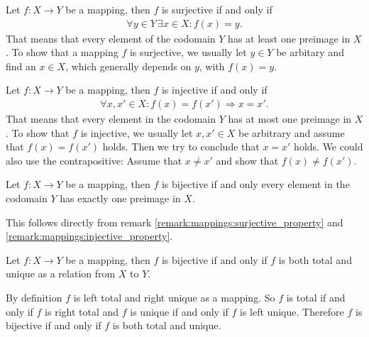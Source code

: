\begin{remarks}
    \begin{remarkenumerate}
        \item\label{remark:mappings:surjective_property} Let $f\colon X\rightarrow Y$ be a mapping, then $f$ is surjective if and only if
        \begin{align}\forall y\in Y\, \exists x\in X\colon f(x)=y.\end{align}
        That means that every element of the codomain $Y$ has at least one preimage in $X$. To show that a mapping $f$ is surjective, we usually let $y\in Y$ be arbitary and find an $x\in X$, which generally depends on $y$, with $f(x)=y$.
        \item\label{remark:mappings:injective_property}  Let $f\colon X\rightarrow Y$ be a mapping, then $f$ is injective if and only if
        \begin{align}\forall x,x'\in X\colon f(x)=f(x')\Rightarrow x=x'.\end{align}
        That means that every element in the codomain $Y$ has at most one preimage in $X$. To show that $f$ is injective, we usually let $x,x'\in X$ be arbitrary and assume that $f(x)=f(x')$ holds. Then we try to conclude that $x=x'$ holds. We could also use the contrapositive: Assume that $x\neq x'$ and show that $f(x)\neq f(x')$.
        \item\label{remark:mappings:bijective_property} Let $f\colon X\rightarrow Y$ be a mapping, then $f$ is bijective if and only every element in the codomain $Y$ has exactly one preimage in $X$.
        \begin{miniproof}
            This follows directly from remark \ref{remark:mappings:surjective_property} and \ref{remark:mappings:injective_property}.
        \end{miniproof}
        \item\label{remark:mappings:bijective_total_unique} Let $f\colon X\rightarrow Y$ be a mapping, then $f$ is bijective if and only if $f$ is both total and unique as a relation from $X$ to $Y$.
        \begin{miniproof}
            By definition $f$ is left total and right unique as a mapping. So $f$ is total if and only if $f$ is right total and $f$ is unique if and only if $f$ is left unique. Therefore $f$ is bijective if and only if $f$ is both total and unique.
        \end{miniproof}
    \end{remarkenumerate}
\end{remarks}

